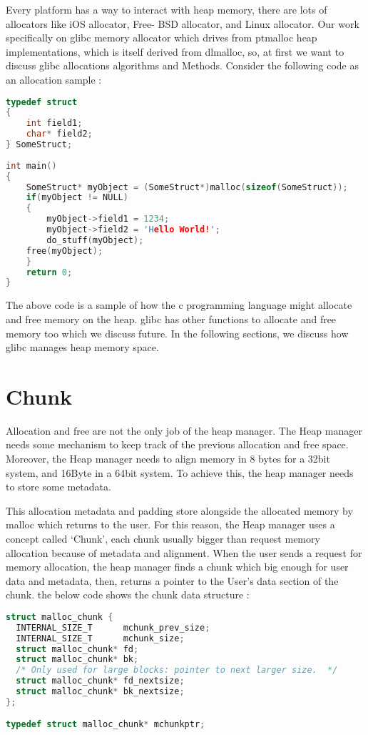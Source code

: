 \documentclass{masterthesis}
\newcommand*\libc{glibc}
\begin{document}
Every platform has a way to interact with heap memory, there are lots of allocators like iOS allocator, Free- BSD allocator, and Linux allocator. Our work specifically on \libc{} memory allocator which drives from ptmalloc heap implementations, which is itself derived from dlmalloc, so, at first we want to discuss \libc{} allocations algorithms and Methods. Consider the following code as an allocation sample : 

\begin{lstlisting}[language=c]
typedef struct 
{
    int field1;
    char* field2;
} SomeStruct;
 
int main()
{
    SomeStruct* myObject = (SomeStruct*)malloc(sizeof(SomeStruct));
    if(myObject != NULL)
    {
        myObject->field1 = 1234;
        myObject->field2 = 'Hello World!';
        do_stuff(myObject);
	free(myObject);
    }
    return 0;
}

\end{lstlisting}

The above code is a sample of how the c programming language might allocate and free memory on the heap. \libc{} has other functions to allocate and free memory too which we discuss future. In the following sections, we discuss how \libc{} manages heap memory space. 

\section{Chunk}

Allocation and free are not the only job of the heap manager. The Heap manager needs some mechanism to keep track of the previous allocation and free space. Moreover, the Heap manager needs to align memory in 8 bytes for a 32bit system, and 16Byte in a 64bit system. To achieve this, the heap manager needs to store some metadata.

This allocation metadata and padding store alongside the allocated memory by malloc which returns to the user. For this reason, the Heap manager uses a concept called ‘Chunk’, each chunk usually bigger than request memory allocation because of metadata and alignment. When the user sends a request for memory allocation, the heap manager finds a chunk which big enough for user data and metadata, then, returns a pointer to the User's data section of the chunk. the below code shows the chunk data structure :

\begin{lstlisting}[language=c]
struct malloc_chunk {
  INTERNAL_SIZE_T      mchunk_prev_size; 
  INTERNAL_SIZE_T      mchunk_size;
  struct malloc_chunk* fd; 
  struct malloc_chunk* bk;
  /* Only used for large blocks: pointer to next larger size.  */
  struct malloc_chunk* fd_nextsize;
  struct malloc_chunk* bk_nextsize;
};

typedef struct malloc_chunk* mchunkptr;
\end{lstlisting}
\end{document}
